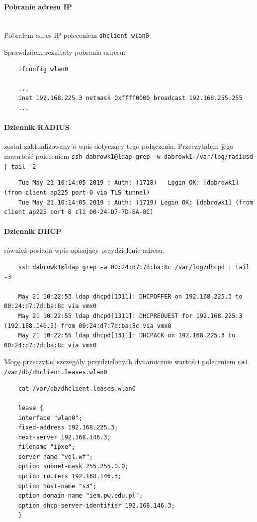 \documentclass{article} %
\begin{document}
\paragraph{Pobranie adresu IP} \mbox{} \\
Pobrałem adres IP poleceniem \texttt{dhclient wlan0}

Sprawdziłem rezultaty pobrania adresu:
\begin{lstlisting}
    ifconfig wlan0

    ...
    inet 192.168.225.3 netmask 0xffff0000 broadcast 192.168.255.255
    ...
\end{lstlisting}

\paragraph{Dziennik RADIUS} został zaktualizowany o wpis dotyczący tego połączenia.
Przeczytałem jego zawartość poleceniem \texttt{ssh dabrowk1@ldap grep -w dabrowk1 /var/log/radiusd | tail -2 }
\begin{lstlisting}
    Tue May 21 10:14:05 2019 : Auth: (1718)   Login OK: [dabrowk1] (from client ap225 port 0 via TLS tunnel)
    Tue May 21 10:14:05 2019 : Auth: (1719) Login OK: [dabrowk1] (from client ap225 port 0 cli 00-24-D7-7D-BA-8C)
\end{lstlisting}

\paragraph{Dziennik DHCP} również posiada wpis opisujący przydzielenie adresu.
\begin{lstlisting}
    ssh dabrowk1@ldap grep -w 00:24:d7:7d:ba:8c /var/log/dhcpd | tail -3

    May 21 10:22:53 ldap dhcpd[1311]: DHCPOFFER on 192.168.225.3 to 00:24:d7:7d:ba:8c via vmx0
    May 21 10:22:55 ldap dhcpd[1311]: DHCPREQUEST for 192.168.225.3 (192.168.146.3) from 00:24:d7:7d:ba:8c via vmx0
    May 21 10:22:55 ldap dhcpd[1311]: DHCPACK on 192.168.225.3 to 00:24:d7:7d:ba:8c via vmx0
\end{lstlisting}

Mogę przeczytać szczegóły przydzielonych dynamicznie wartości poleceniem \texttt{cat /var/db/dhclient.leases.wlan0}.
\begin{lstlisting}
    cat /var/db/dhclient.leases.wlan0

    lease {
    interface "wlan0";
    fixed-address 192.168.225.3;
    next-server 192.168.146.3;
    filename "ipxe";
    server-name "vol.wf";
    option subnet-mask 255.255.0.0;
    option routers 192.168.146.3;
    option host-name "s3";
    option domain-name "iem.pw.edu.pl";
    option dhcp-server-identifier 192.168.146.3;
    }
\end{lstlisting}
\end{document}

